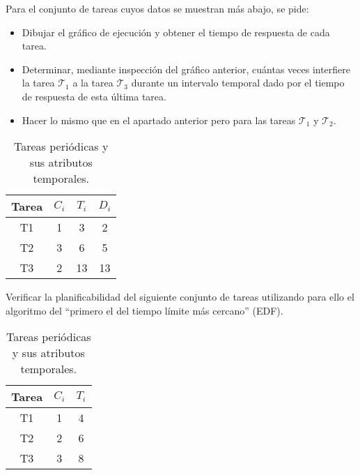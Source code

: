 \begin{ejercicio}\label{ej:rel4_8}
    Para el conjunto de tareas cuyos datos se muestran más abajo, se pide:
    \begin{itemize}
        \item Dibujar el gráfico de ejecución y obtener el tiempo de respuesta de cada tarea.
        \item Determinar, mediante inspección del gráfico anterior, cuántas veces interfiere la tarea $\mathcal{T}_1$ a la tarea $\mathcal{T}_3$ durante un intervalo temporal dado por el tiempo de respuesta de esta última tarea.
        \item Hacer lo mismo que en el apartado anterior pero para las tareas $\mathcal{T}_1$ y $\mathcal{T}_2$.
    \end{itemize}
    \begin{table}[H]
    \centering
    \begin{tabular}{|c|c|c|c|}
        \hline
        Tarea & $C_i$ & $T_i$ & $D_i$ \\
        \hline
        T1 & 1 & 3 & 2 \\
        \hline
        T2 & 3 & 6 & 5 \\
        \hline
        T3 & 2 & 13 & 13 \\
        \hline
    \end{tabular}
    \caption{Tareas periódicas y sus atributos temporales.}
    \label{tab:4_8}
    \end{table}
\end{ejercicio}

\begin{ejercicio}\label{ej:rel4_9}
    Verificar la planificabilidad del siguiente conjunto de tareas utilizando para ello el algoritmo del ``primero el del tiempo límite más cercano'' (EDF).
    \begin{table}[H]
    \centering
    \begin{tabular}{|c|c|c|}
        \hline
        Tarea & $C_i$ & $T_i$ \\
        \hline
        T1 & 1 & 4 \\
        \hline
        T2 & 2 & 6 \\
        \hline
        T3 & 3 & 8 \\
        \hline
    \end{tabular}
    \caption{Tareas periódicas y sus atributos temporales.}
    \label{tab:4_9}
    \end{table}
\end{ejercicio}

